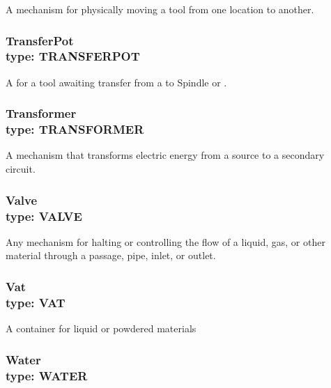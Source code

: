 A mechanism for physically moving a tool from one location to another.



\subsubsection[TransferPot]{TransferPot \\ {\small type: TRANSFER\textunderscore POT}}
\label{sec:TransferPot}



A  for a tool awaiting transfer from a  to \gls{Spindle} or .



\subsubsection[Transformer]{Transformer \\ {\small type: TRANSFORMER}}
\label{sec:Transformer}



A mechanism that transforms electric energy from a source to a secondary circuit.



\subsubsection[Valve]{Valve \\ {\small type: VALVE}}
\label{sec:Valve}



Any mechanism for halting or controlling the flow of a liquid, gas, or other material through a passage, pipe, inlet, or outlet.



\subsubsection[Vat]{Vat \\ {\small type: VAT}}
\label{sec:Vat}



A container for liquid or powdered materials



\subsubsection[Water]{Water \\ {\small type: WATER}}
\label{sec:Water}



